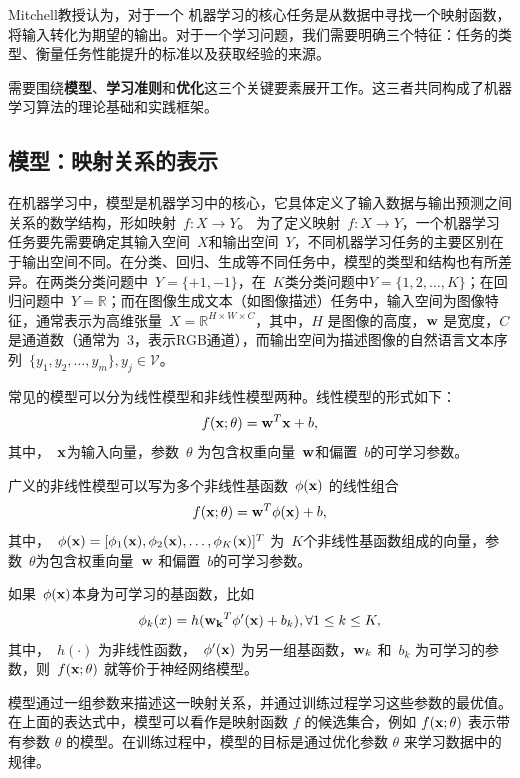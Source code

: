 Mitchell教授认为，对于一个
机器学习的核心任务是从数据中寻找一个映射函数，将输入转化为期望的输出。对于一个学习问题，我们需要明确三个特征：任务的类型、衡量任务性能提升的标准以及获取经验的来源。

需要围绕{\bf 模型}、{\bf 学习准则}和{\bf 优化}这三个关键要素展开工作。这三者共同构成了机器学习算法的理论基础和实践框架。

\subsection{模型：映射关系的表示}

在机器学习中，模型是机器学习中的核心，它具体定义了输入数据与输出预测之间关系的数学结构，形如映射~$f: X \rightarrow Y$。
为了定义映射~$f: X \rightarrow Y$，一个机器学习任务要先需要确定其输入空间~$X$和输出空间~$Y$，不同机器学习任务的主要区别在于输出空间不同。在分类、回归、生成等不同任务中，模型的类型和结构也有所差异。在两类分类问题中~$Y = \{+1,-1\}$，在~$K$类分类问题中$Y =\{1, 2,\dots , K\}$；在回归问题中~$Y = \mathbb{R}$；而在图像生成文本（如图像描述）任务中，输入空间为图像特征，通常表示为高维张量~$X=\mathbb{R}^{H\times W\times C}$，其中，$H$ 是图像的高度，${\bf w}$ 是宽度，$C$ 是通道数（通常为~$3$，表示RGB通道），而输出空间为描述图像的自然语言文本序列~$\{y_1,y_2,\dots, y_m \}, y_j\in \mathcal{V}$。

常见的模型可以分为线性模型和非线性模型两种。线性模型的形式如下：
$$
f({\bf x}; \theta)= {\bf w}^T{\bf x} +b, 
$$
其中，~${\bf x}$为输入向量，参数~$\theta$ 为包含权重向量~${\bf w}$和偏置~$b$的可学习参数。

广义的非线性模型可以写为多个非线性基函数~$\phi({\bf x})$ 的线性组合
\begin{equation*}\label{ref}
f({\bf x}; \theta) = {\bf w}^T {\bf \phi}({\bf x}) + b, 
\end{equation*}
其中，~$\phi({\bf x}) = [ \phi_1({\bf x}),\phi_2({\bf x}),\dots ,\phi_K({\bf x})]^T$ 为~$K$个非线性基函数组成的向量，参数~$\theta$为包含权重向量~${\bf w}$ 和偏置~$b$的可学习参数。

如果~$\phi({\bf x})$本身为可学习的基函数，比如
\begin{equation*}
\phi_k(x) = h({\bf w_k}^T\phi^\prime({\bf x}) + b _k), \forall 1 \le  k \le K,
\end{equation*}  
其中，~$h(\cdot)$ 为非线性函数，~$\phi^\prime ({\bf x})$ 为另一组基函数，${\bf w}_k$ 和~$b_k$ 为可学习的参数，则~$f ({\bf x};\theta)$ 就等价于神经网络模型。

模型通过一组参数来描述这一映射关系，并通过训练过程学习这些参数的最优值。在上面的表达式中，模型可以看作是映射函数 $f$ 的候选集合，例如 $f ({\bf x};\theta)$ 表示带有参数 $\theta$ 的模型。在训练过程中，模型的目标是通过优化参数 $\theta$ 来学习数据中的规律。

